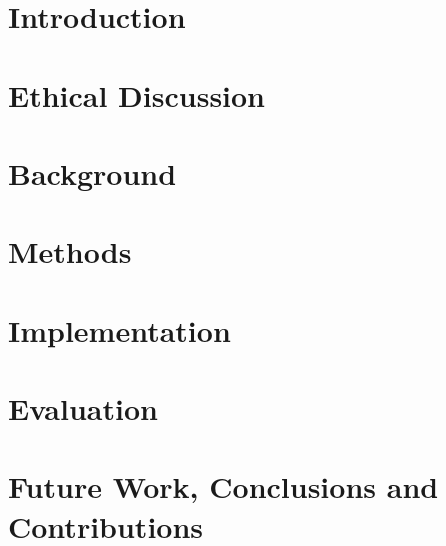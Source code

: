 \documentclass[12pt,twoside]{report}
\begin{document}
\tableofcontents


\clearpage{\pagestyle{empty}\clearpage}
\setcounter{page}{1}
\fancyhead[LE,RO]{\slshape \rightmark}
\fancyhead[LO,RE]{\slshape \leftmark}

\chapter{Introduction}


\chapter{Ethical Discussion}

\label{sect:ethics}

\chapter{Background}

\label{sect:3d}

\label{sect:nix}

\chapter{Methods}

\label{sect:projection}

\chapter{Implementation}

\label{sect:overview}

\label{sect:buildsystem}

\label{sect:renderer}

\label{sect:tracker}

\label{sect:userstudy}

\chapter{Evaluation}
 
\label{sect:eval-volsim}

\label{sect:eval-userstudy}

\chapter{Future Work, Conclusions and Contributions}

\label{sect:conclusions}
\end{document}
